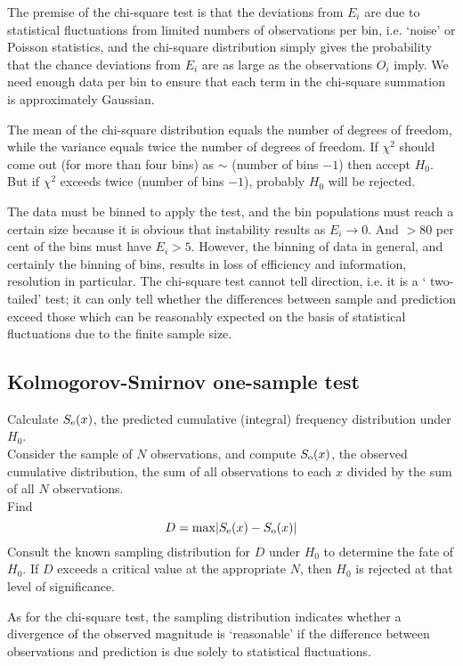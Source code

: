 \documentclass[12pt,a4paper]{article}
\begin{document}
The premise of the chi-square test is that the deviations from $E_i$ are due to statistical fluctuations from limited numbers of observations per bin, i.e. `noise' or Poisson statistics, and the chi-square distribution simply gives the probability that the chance deviations from $E_i$ are as large as the observations $O_i$ imply. We need enough data per bin to ensure that each term in the chi-square summation is approximately Gaussian.

The mean of the chi-square distribution equals the number of degrees of freedom, while the variance equals twice
the number of degrees of freedom. If $\chi^2$ should come out (for more than four bins) as $\sim$ (number of bins $-1$) then accept $H_0$. But if $\chi^2$ exceeds twice (number of bins $-1$), probably $H_0$ will be rejected.

The data must be binned to apply the test, and the bin populations must reach a certain size because it is obvious that instability results as $E_i \rightarrow 0$. And $> 80$ per cent of the bins must have $E_i > 5$. However, the binning of data in general, and certainly the binning of bins, results in loss of efficiency and information, resolution in particular. The chi-square test cannot tell direction, i.e. it is a ‘ two-tailed’ test; it can only tell whether the differences between sample and prediction exceed those which can be reasonably expected on the basis of statistical fluctuations due to the finite sample size. 

\subsection{Kolmogorov-Smirnov one-sample test}
Calculate $S_{\rm e}(x)$, the predicted cumulative (integral) frequency distribution under $H_0$. \\
Consider the sample of $N$ observations, and compute $S_{\rm o}(x)$, the observed cumulative distribution, the sum of all observations to each $x$ divided by the sum of all $N$ observations. \\
Find
\begin{equation}
D = {\rm max}|S_{\rm e}(x) - S_{\rm o}(x)|
\end{equation}
Consult the known sampling distribution for $D$ under $H_0$ to determine the fate of $H_0$. If $D$ exceeds a critical value at the appropriate $N$, then $H_0$ is rejected at that level of significance.

As for the chi-square test, the sampling distribution indicates whether a divergence of the observed magnitude is `reasonable' if the difference between observations and prediction is due solely to statistical fluctuations.
\end{document}
